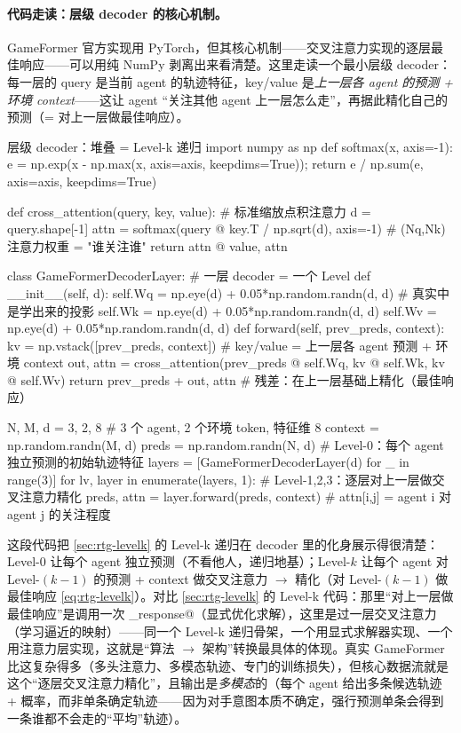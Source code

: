 \paragraph{代码走读：层级 decoder 的核心机制。}
GameFormer 官方实现用 PyTorch，但其核心机制——交叉注意力实现的逐层最佳响应——可以用纯 NumPy 剥离出来看清楚。这里走读一个最小层级 decoder：每一层的 query 是当前 agent 的轨迹特征，key/value 是\emph{上一层各 agent 的预测 + 环境 context}——这让 agent “关注其他 agent 上一层怎么走”，再据此精化自己的预测（= 对上一层做最佳响应）。

\begin{codebox}[Python]{层级 decoder：堆叠 = Level-k 递归}
import numpy as np
def softmax(x, axis=-1):
    e = np.exp(x - np.max(x, axis=axis, keepdims=True)); return e / np.sum(e, axis=axis, keepdims=True)

def cross_attention(query, key, value):            # 标准缩放点积注意力
    d = query.shape[-1]
    attn = softmax(query @ key.T / np.sqrt(d), axis=-1)   # (Nq,Nk) 注意力权重 = "谁关注谁"
    return attn @ value, attn

class GameFormerDecoderLayer:                       # 一层 decoder = 一个 Level
    def __init__(self, d):
        self.Wq = np.eye(d) + 0.05*np.random.randn(d, d)   # 真实中是学出来的投影
        self.Wk = np.eye(d) + 0.05*np.random.randn(d, d)
        self.Wv = np.eye(d) + 0.05*np.random.randn(d, d)
    def forward(self, prev_preds, context):
        kv = np.vstack([prev_preds, context])      # key/value = 上一层各 agent 预测 + 环境 context
        out, attn = cross_attention(prev_preds @ self.Wq, kv @ self.Wk, kv @ self.Wv)
        return prev_preds + out, attn              # 残差：在上一层基础上精化（最佳响应）

N, M, d = 3, 2, 8                                   # 3 个 agent, 2 个环境 token, 特征维 8
context = np.random.randn(M, d)
preds = np.random.randn(N, d)                       # Level-0：每个 agent 独立预测的初始轨迹特征
layers = [GameFormerDecoderLayer(d) for _ in range(3)]
for lv, layer in enumerate(layers, 1):             # Level-1,2,3：逐层对上一层做交叉注意力精化
    preds, attn = layer.forward(preds, context)    # attn[i,j] = agent i 对 agent j 的关注程度
\end{codebox}

\noindent 这段代码把 \cref{sec:rtg-levelk} 的 Level-k 递归在 decoder 里的化身展示得很清楚：Level-0 让每个 agent 独立预测（不看他人，递归地基）；Level-$k$ 让每个 agent 对 Level-$(k-1)$ 的预测 + context 做交叉注意力 $\to$ 精化（对 Level-$(k-1)$ 做最佳响应 \cref{eq:rtg-levelk}）。对比 \cref{sec:rtg-levelk} 的 Level-k 代码：那里“对上一层做最佳响应”是调用一次 \verb@best_response@（显式优化求解），这里是过一层交叉注意力（学习逼近的映射）——同一个 Level-k 递归骨架，一个用显式求解器实现、一个用注意力层实现，这就是“算法 $\to$ 架构”转换最具体的体现。真实 GameFormer 比这复杂得多（多头注意力、多模态轨迹、专门的训练损失），但核心数据流就是这个“逐层交叉注意力精化”，且输出是\emph{多模态}的（每个 agent 给出多条候选轨迹 + 概率，而非单条确定轨迹——因为对手意图本质不确定，强行预测单条会得到一条谁都不会走的“平均”轨迹）。


